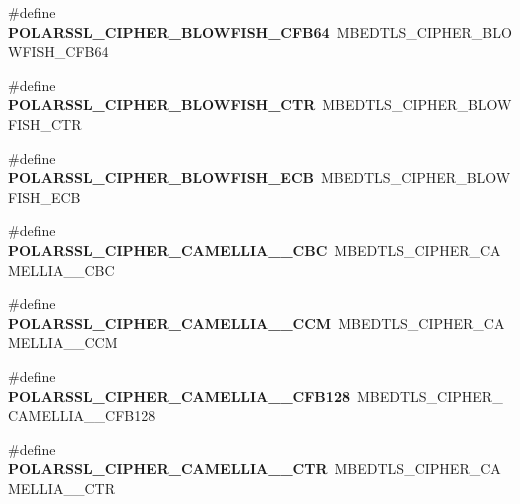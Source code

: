 \begin{DoxyCompactItemize}
\item 
\mbox{\label{compat-1_83_8h_a2d072f88144e3fd5ebd4d8a6a9587bb0}} 
\#define {\bfseries P\+O\+L\+A\+R\+S\+S\+L\+\_\+\+C\+I\+P\+H\+E\+R\+\_\+\+B\+L\+O\+W\+F\+I\+S\+H\+\_\+\+C\+F\+B64}~M\+B\+E\+D\+T\+L\+S\+\_\+\+C\+I\+P\+H\+E\+R\+\_\+\+B\+L\+O\+W\+F\+I\+S\+H\+\_\+\+C\+F\+B64
\item 
\mbox{\label{compat-1_83_8h_a2d5decbff1af67d0701542361e35eb08}} 
\#define {\bfseries P\+O\+L\+A\+R\+S\+S\+L\+\_\+\+C\+I\+P\+H\+E\+R\+\_\+\+B\+L\+O\+W\+F\+I\+S\+H\+\_\+\+C\+TR}~M\+B\+E\+D\+T\+L\+S\+\_\+\+C\+I\+P\+H\+E\+R\+\_\+\+B\+L\+O\+W\+F\+I\+S\+H\+\_\+\+C\+TR
\item 
\mbox{\label{compat-1_83_8h_a60fcc5818261982812538b6e57ed9cf4}} 
\#define {\bfseries P\+O\+L\+A\+R\+S\+S\+L\+\_\+\+C\+I\+P\+H\+E\+R\+\_\+\+B\+L\+O\+W\+F\+I\+S\+H\+\_\+\+E\+CB}~M\+B\+E\+D\+T\+L\+S\+\_\+\+C\+I\+P\+H\+E\+R\+\_\+\+B\+L\+O\+W\+F\+I\+S\+H\+\_\+\+E\+CB
\item 
\mbox{\label{compat-1_83_8h_a45e63fa5969c68cc71e679618794284f}} 
\#define {\bfseries P\+O\+L\+A\+R\+S\+S\+L\+\_\+\+C\+I\+P\+H\+E\+R\+\_\+\+C\+A\+M\+E\+L\+L\+I\+A\+\_\+\_\+\+C\+BC}~M\+B\+E\+D\+T\+L\+S\+\_\+\+C\+I\+P\+H\+E\+R\+\_\+\+C\+A\+M\+E\+L\+L\+I\+A\+\_\+\_\+\+C\+BC
\item 
\mbox{\label{compat-1_83_8h_afb07268dd1ad947f7156d13b426b9fa7}} 
\#define {\bfseries P\+O\+L\+A\+R\+S\+S\+L\+\_\+\+C\+I\+P\+H\+E\+R\+\_\+\+C\+A\+M\+E\+L\+L\+I\+A\+\_\+\_\+\+C\+CM}~M\+B\+E\+D\+T\+L\+S\+\_\+\+C\+I\+P\+H\+E\+R\+\_\+\+C\+A\+M\+E\+L\+L\+I\+A\+\_\+\_\+\+C\+CM
\item 
\mbox{\label{compat-1_83_8h_a3292c3c9360e493d81ebe212aaafe8e8}} 
\#define {\bfseries P\+O\+L\+A\+R\+S\+S\+L\+\_\+\+C\+I\+P\+H\+E\+R\+\_\+\+C\+A\+M\+E\+L\+L\+I\+A\+\_\+\_\+\+C\+F\+B128}~M\+B\+E\+D\+T\+L\+S\+\_\+\+C\+I\+P\+H\+E\+R\+\_\+\+C\+A\+M\+E\+L\+L\+I\+A\+\_\+\_\+\+C\+F\+B128
\item 
\mbox{\label{compat-1_83_8h_a4e770a54964e63bfafe2ae68417566ba}} 
\#define {\bfseries P\+O\+L\+A\+R\+S\+S\+L\+\_\+\+C\+I\+P\+H\+E\+R\+\_\+\+C\+A\+M\+E\+L\+L\+I\+A\+\_\+\_\+\+C\+TR}~M\+B\+E\+D\+T\+L\+S\+\_\+\+C\+I\+P\+H\+E\+R\+\_\+\+C\+A\+M\+E\+L\+L\+I\+A\+\_\+\_\+\+C\+TR

\end{DoxyCompactItemize}
